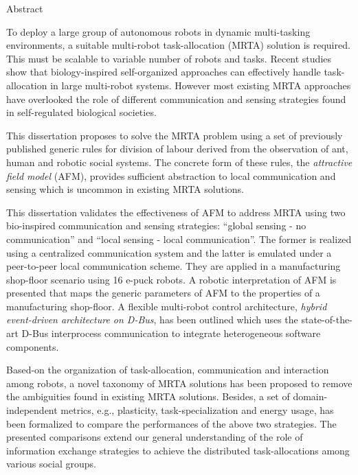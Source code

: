 \begin{Large}
Abstract\\
\end{Large}
\newline
To deploy a large group of autonomous robots in dynamic multi-tasking environments, a suitable multi-robot task-allocation (MRTA) solution is required. This must be scalable to variable number of robots and tasks. Recent studies show that biology-inspired self-organized approaches can effectively handle task-allocation in large multi-robot systems. However most existing MRTA approaches have overlooked the role of different communication and sensing strategies found in self-regulated biological societies.

This dissertation proposes to solve the MRTA problem using a set of previously published generic rules for division of labour derived from the observation of ant, human and robotic social systems. The concrete form of these rules, the \textit{attractive field model} (AFM), provides sufficient abstraction to local communication and sensing which is uncommon in existing MRTA solutions. 

This dissertation validates the effectiveness of AFM to address MRTA  using two bio-inspired communication and sensing strategies: ``global sensing - no communication'' and ``local sensing - local communication''. The former is realized using a centralized communication system and the latter is emulated under a peer-to-peer local communication scheme. They are applied in a  manufacturing shop-floor scenario using 16 e-puck robots. A robotic interpretation of AFM is presented that maps the generic parameters of AFM to the properties of a manufacturing shop-floor. A flexible multi-robot control architecture, \textit{hybrid event-driven architecture on D-Bus}, has been outlined which uses the state-of-the-art D-Bus interprocess communication  to integrate heterogeneous software components. 

Based-on the organization of task-allocation, communication and interaction among robots, a  novel taxonomy of MRTA solutions has been proposed to remove the ambiguities found in existing MRTA solutions. Besides, a set of domain-independent metrics, e.g., plasticity, task-specialization and energy usage, has been formalized to compare the performances of the above two strategies. The presented comparisons extend our general understanding of the role of information exchange strategies to achieve the distributed task-allocations among various social groups.
